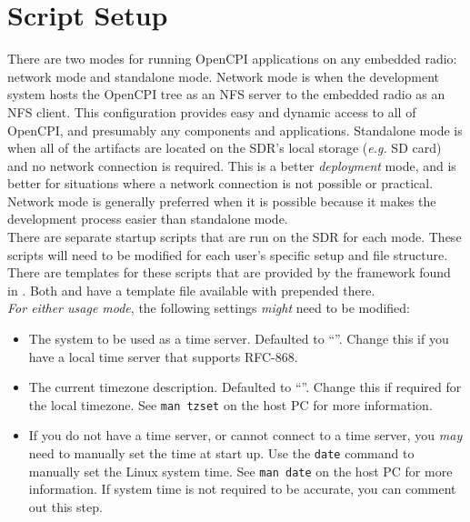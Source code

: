 \section{Script Setup}
\label{sec:script}
There are two modes for running OpenCPI applications on any embedded radio: network mode and standalone mode. Network mode is when the development system hosts the OpenCPI tree as an NFS server to the embedded radio as an NFS client. This configuration provides easy and dynamic access to all of OpenCPI, and presumably any components and applications. Standalone mode is when all of the artifacts are located on the SDR's local storage (\textit{e.g.} SD card) and no network connection is required. This is a better \textit{deployment} mode, and is better for situations where a network connection is not possible or practical. Network mode is generally preferred when it is possible because it makes the development process easier than standalone mode. \\

There are separate startup scripts that are run on the SDR for each mode. These scripts will need to be modified for each user's specific setup and file structure. There are templates for these scripts that are provided by the framework found in . Both  and  have a template file available with  prepended there. \\

\textit{For either usage mode}, the following settings \textit{might} need to be modified:

\begin{itemize}
 \item The system to be used as a time server. Defaulted to ``''. Change this if you have a local time server that supports RFC-868.
 \item The current timezone description. Defaulted to ``''.  Change this if required for the local timezone. See \texttt{man tzset} on the host PC for more information.
 \item If you do not have a time server, or cannot connect to a time server, you \textit{may} need to manually set the time at start up.  Use the \texttt{date} command to manually set the Linux system time. See \texttt{man date} on the host PC for more information. If system time is not required to be accurate, you can comment out this step.
\end{itemize}

